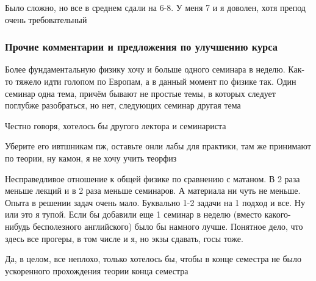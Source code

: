             \begin{commentbox} 
                Было сложно, но все в среднем сдали на 6-8. У меня 7 и я доволен, хотя препод очень требовательный 
            \end{commentbox} 


	\subsubsection{Прочие комментарии и предложения по улучшению курса}
        \begin{commentbox}
            Более фундаментальную физику хочу и больше одного семинара в неделю. Как-то тяжело идти голопом по Европам, а в данный момент по физике так. Один семинар одна тема, причём бывают не простые темы, в которых следует поглубже разобраться, но нет, следующих семинар другая тема
        \end{commentbox}

        \begin{commentbox}
            Честно говоря, хотелось бы другого лектора и семинариста
        \end{commentbox}

        \begin{commentbox}
            Уберите его ивтшникам пж, оставьте онли лабы для практики, там же принимают по теории, ну камон, я не хочу учить теорфиз
        \end{commentbox}

        \begin{commentbox}
            Несправедливое отношение к общей физике по сравнению с матаном. В 2 раза меньше лекций и в 2 раза меньше семинаров. А материала ни чуть не меньше. Опыта в решении задач очень мало. Буквально 1-2 задачи на 1 подход и все. Ну или это я тупой. Если бы добавили еще 1 семинар в неделю (вместо какого-нибудь бесполезного английского) было бы намного лучше. Понятное дело, что здесь все прогеры, в том числе и я, но экзы сдавать, госы тоже.
        \end{commentbox}

        \begin{commentbox}
            Да, в целом, все неплохо, только хотелось бы, чтобы в конце семестра не было ускоренного прохождения теории конца семестра
        \end{commentbox}
            